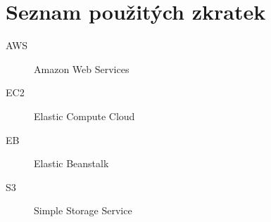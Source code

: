 \chapter{Seznam použitých zkratek}

\begin{description}
	\item[AWS] Amazon Web Services
	\item[EC2] Elastic Compute Cloud
	\item[EB] Elastic Beanstalk
	\item[S3] Simple Storage Service
\end{description}
	